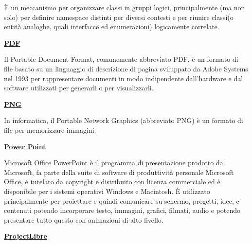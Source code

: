 \medskip
\begin{addmargin}[5em]{1em}	
È un meccanismo per organizzare classi in gruppi logici, principalmente (ma non solo) per definire namespace distinti per diversi contesti e per riunire classi(o entità analoghe, quali interfacce ed enumerazioni) logicamente correlate.
\end{addmargin}	

\bigskip

\begin{addmargin}[0em]{0em}	
	\textbf{\underline{PDF}} 
\end{addmargin}

\medskip
\begin{addmargin}[5em]{1em}	
Il Portable Document Format, comunemente abbreviato PDF, è un formato di file basato su un linguaggio di descrizione di pagina sviluppato da Adobe Systems nel 1993 per rappresentare documenti in modo indipendente dall'hardware e dal software utilizzati per generarli o per visualizzarli.
\end{addmargin}	

\bigskip
\begin{addmargin}[0em]{0em}	
	\textbf{\underline{PNG}} 
\end{addmargin}
\medskip
\begin{addmargin}[5em]{1em}
In informatica, il Portable Network Graphics (abbreviato PNG) è un formato di file per memorizzare immagini.
\end{addmargin}	

\bigskip
\begin{addmargin}[0em]{0em}	
	\textbf{\underline{Power Point}}
\end{addmargin} 

\medskip
\begin{addmargin}[5em]{1em}
Microsoft Office PowerPoint è il programma di presentazione prodotto da Microsoft, fa parte della suite di software di produttività personale Microsoft Office, è tutelato da copyright e distribuito con licenza commerciale ed è disponibile per i sistemi operativi Windows e Macintosh. È utilizzato principalmente per proiettare e quindi comunicare su schermo, progetti, idee, e contenuti potendo incorporare testo, immagini, grafici, filmati, audio e potendo presentare tutto questo con animazioni di alto livello.
\end{addmargin}	

\bigskip
\begin{addmargin}[0em]{0em}	
	\textbf{\underline{ProjectLibre}} 
\end{addmargin}
	
